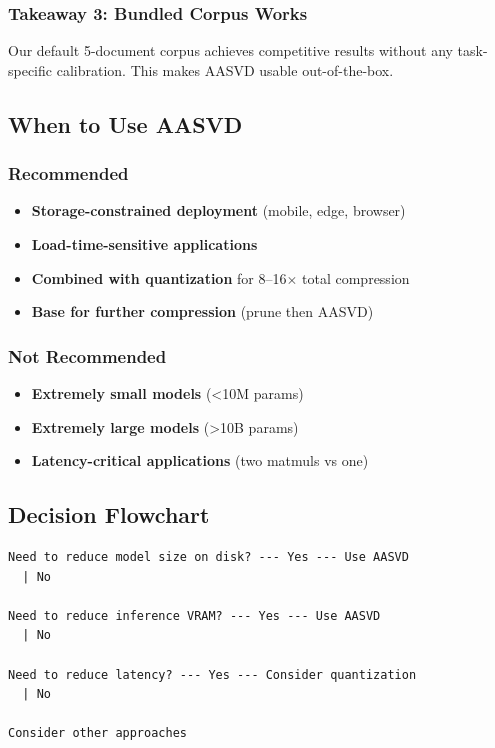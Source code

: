 \subsubsection{Takeaway 3: Bundled Corpus Works}

Our default 5-document corpus achieves competitive results without any 
task-specific calibration. This makes AASVD usable out-of-the-box.

\subsection{When to Use AASVD}

\subsubsection{Recommended}

\begin{itemize}
\item \textbf{Storage-constrained deployment} (mobile, edge, browser)
\item \textbf{Load-time-sensitive applications}
\item \textbf{Combined with quantization} for 8--16$\times$ total compression
\item \textbf{Base for further compression} (prune then AASVD)

\end{itemize}
\subsubsection{Not Recommended}

\begin{itemize}
\item \textbf{Extremely small models} (\textless{}10M params)
\item \textbf{Extremely large models} (\textgreater{}10B params)
\item \textbf{Latency-critical applications} (two matmuls vs one)

\end{itemize}
\subsection{Decision Flowchart}

\begin{lstlisting}
Need to reduce model size on disk? --- Yes --- Use AASVD
  | No
   
Need to reduce inference VRAM? --- Yes --- Use AASVD
  | No
   
Need to reduce latency? --- Yes --- Consider quantization
  | No
   
Consider other approaches
\end{lstlisting}

